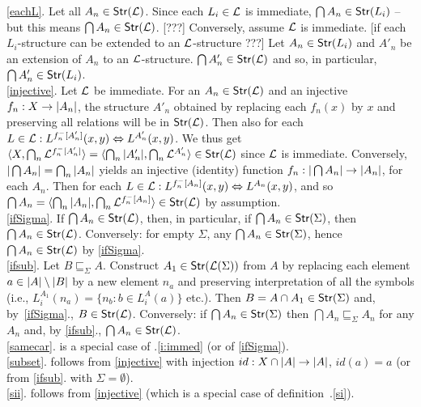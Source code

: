 \documentclass[12pt]{article}
\begin{document}
\begin{Proof} 
\ref{eachL}. Let all $A_n\in{\sf {Str}}({{\cal{L}}})$. Since each $L_i\in{{\cal{L}}}$ is immediate,
$\bigcap A_n\in{\sf {Str}}(L_i)$ -- but this means $\bigcap A_n\in{\sf {Str}}({{\cal{L}}})$. [???]
Conversely, assume ${{\cal{L}}}$ is immediate. [if each $L_i$-structure can be
extended to an ${{\cal{L}}}$-structure ???] Let $A_n\in{\sf {Str}}(L_i)$ and $A'_n$ be an
extension of $A_n$ to an ${{\cal{L}}}$-structure. $\bigcap A'_n\in{\sf {Str}}({{\cal{L}}})$ and so,
in particular, $\bigcap A'_n\in{\sf {Str}}(L_i)$. \\[1ex]
\ref{injective}. Let ${{\cal{L}}}$ be immediate. For an $A_n\in{\sf {Str}}({{\cal{L}}})$ and an injective
$f_n:X\rightarrow|A_n|$, the structure $A'_n$ obtained by replacing each
$f_n(x)$ by $x$ and preserving all relations will be in ${\sf {Str}}({{\cal{L}}})$. Then also
for each $L\in{{\cal{L}}}:L^{f_{n}^{-}[A'_{n}]}(x,y) \Leftrightarrow L^{A'_{n}}(x,y)$. We thus
get $\langle X,\bigcap_n {{\cal{L}}}^{f_{n}^{-}[A'_{n}]}\rangle = \langle\bigcap_n|A'_n|, \bigcap_n
{{\cal{L}}}^{A'_{n}}\rangle\in{\sf {Str}}({{\cal{L}}})$ since ${{\cal{L}}}$ is immediate. 
Conversely, $|\bigcap A_n|= \bigcap_n |A_n|$ yields
an injective (identity) function $f_n:|\bigcap A_n|\rightarrow |A_n|$,
for each $A_n$. 
Then for each $L\in{{\cal{L}}}:L^{f_{n}^{-}[A_{n}]}(x,y) \Leftrightarrow L^{A_{n}}(x,y)$, and so
$\bigcap A_n = \langle\bigcap_n|A_n|,\bigcap_n
{{\cal{L}}}^{f_{n}^{-}[A_{n}]}\rangle\in{\sf {Str}}({{\cal{L}}})$ by assumption.
\\[1ex]
\ref{ifSigma}. 
If $\bigcap A_n\in{\sf {Str}}({{\cal{L}}})$, then, in particular, if
$\bigcap A_n\in{\sf {Str}}(\Sigma)$, then $\bigcap A_n\in{\sf {Str}}({{\cal{L}}})$.
Conversely: for empty $\Sigma$, any $\bigcap A_n\in{\sf {Str}}(\Sigma)$,
hence $\bigcap A_n\in{\sf {Str}}({{\cal{L}}})$ by \ref{ifSigma}. \\[1ex]
%
\ref{ifsub}. 
Let $B\sqsubseteq_\Sigma A$. Construct $A_1\in{\sf {Str}}({{\cal{L}}}(\Sigma))$ from $A$ by
replacing each element $a\in |A|\setminus|B|$ by
a new element $n_a$ and preserving interpretation of all the symbols (i.e.,
$L_i^{A_1}(n_a) = \{n_b: b\in L_i^A(a)\}$ etc.).  Then $B=A\cap A_1\in{\sf {Str}}(\Sigma)$
and, by~\ref{ifSigma}., $B\in{\sf {Str}}({{\cal{L}}})$.
Conversely: if $\bigcap A_n\in{\sf {Str}}(\Sigma)$ then $\bigcap A_n\sqsubseteq_\Sigma
A_n$ for any $A_n$ and, by \ref{ifsub}., $\bigcap A_n\in {\sf {Str}}({{\cal{L}}})$. \\[1ex]
\ref{samecar}. 
is a special case of .\ref{i:immed} (or of \ref{ifSigma}).\\[1ex]
%
\ref{subset}. 
follows from \ref{injective} with injection $id:X\cap|A|\rightarrow|A|$, $id(a)=a$
(or from \ref{ifsub}. with $\Sigma=\emptyset$). \\[1ex]
%
\ref{sii}. follows from \ref{injective} (which is a special case of definition~.\ref{si}).
\end{Proof}
\end{document}
